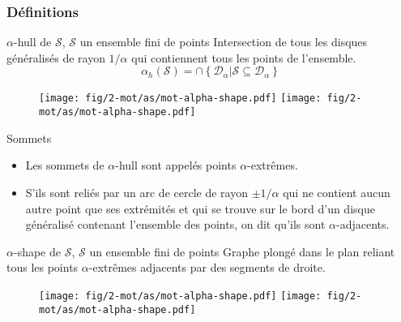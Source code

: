 \begin{frame}
\frametitle{Définitions}
{ 
  \begin{block}{$\alpha$-hull de $\mathcal{S}$, $\mathcal{S}$ un ensemble fini de points}
    Intersection de tous les disques généralisés de rayon $1/\alpha$ qui contiennent tous les points de l'ensemble.
    $$ \alpha_h(\mathcal{S}) = \cap \left\{ \mathcal{D}_{\alpha} | \mathcal{S} \subseteq \mathcal{D}_{\alpha} \right\}$$
    \begin{figure}[H]
      \centering
      \texttt{[image: fig/2-mot/as/mot-alpha-shape.pdf]}
      \texttt{[image: fig/2-mot/as/mot-alpha-shape.pdf]}
    \end{figure} 
  \end{block}
}
{
  \begin{exampleblock}{Sommets}
    \begin{itemize}
      \item Les sommets de $\alpha$-hull sont appelés points $\alpha$-extrêmes.
      \item S'ils sont reliés par un arc de cercle de rayon $\pm 1/ \alpha$ qui ne contient aucun autre point que ses extrémités et qui se trouve sur le bord d'un disque généralisé contenant l'ensemble des points, on dit qu'ils sont $\alpha$-adjacents.
    \end{itemize}
  \end{exampleblock}
}
{
  \begin{block}{$\alpha$-shape de $\mathcal{S}$, $\mathcal{S}$ un ensemble fini de points}
        Graphe plongé dans le plan reliant tous les points $\alpha$-extrêmes adjacents par des segments de droite.
    \begin{figure}[H]
      \centering
      \texttt{[image: fig/2-mot/as/mot-alpha-shape.pdf]}
      \texttt{[image: fig/2-mot/as/mot-alpha-shape.pdf]}
    \end{figure}
  \end{block}
}
\end{frame}


